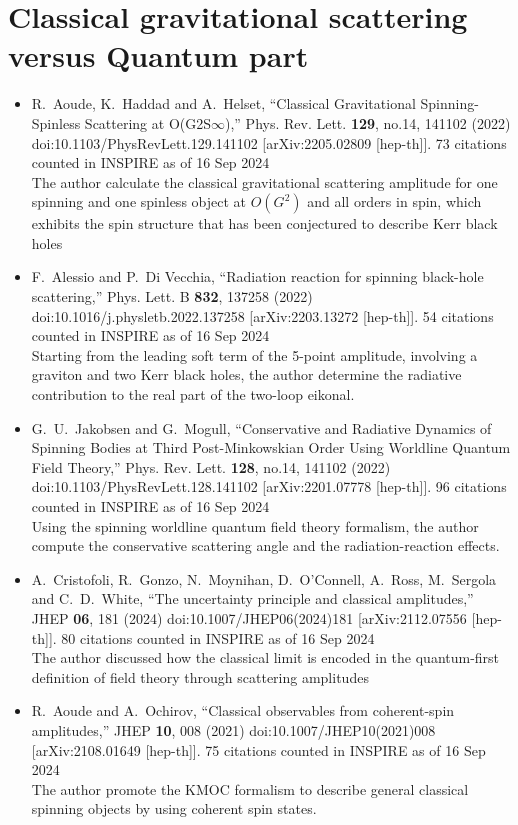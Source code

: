 \documentclass[a4paper,12pt]{article}
\begin{document}
\section*{Classical gravitational scattering versus Quantum part}
\begin{itemize}
    \item %
    R.~Aoude, K.~Haddad and A.~Helset,
    ``Classical Gravitational Spinning-Spinless Scattering at O(G2S\ensuremath{\infty}),''
    Phys. Rev. Lett. \textbf{129}, no.14, 141102 (2022)\\
    doi:10.1103/PhysRevLett.129.141102
    [arXiv:2205.02809 [hep-th]].
    73 citations counted in INSPIRE as of 16 Sep 2024\\
    The author calculate
    the classical gravitational scattering amplitude for one spinning and one spinless object at $O(G^2)$
    and all orders in spin, which exhibits the spin structure that has been
    conjectured to describe Kerr black holes
    \item %
    F.~Alessio and P.~Di Vecchia,
    ``Radiation reaction for spinning black-hole scattering,''
    Phys. Lett. B \textbf{832}, 137258 (2022)
    doi:10.1016/j.physletb.2022.137258
    [arXiv:2203.13272 [hep-th]].
    54 citations counted in INSPIRE as of 16 Sep 2024\\
    Starting from the leading soft term of the 5-point amplitude, involving a graviton and two Kerr black holes, the author determine the
    radiative contribution to the real part of the two-loop eikonal.
    \item %
    G.~U.~Jakobsen and G.~Mogull,
    ``Conservative and Radiative Dynamics of Spinning Bodies at Third Post-Minkowskian Order Using Worldline Quantum Field Theory,''
    Phys. Rev. Lett. \textbf{128}, no.14, 141102 (2022)
    doi:10.1103/PhysRevLett.128.141102
    [arXiv:2201.07778 [hep-th]].
    96 citations counted in INSPIRE as of 16 Sep 2024\\
    Using the spinning worldline quantum field theory formalism, the author compute the conservative scattering angle and the radiation-reaction effects.
    \item %
    A.~Cristofoli, R.~Gonzo, N.~Moynihan, D.~O'Connell, A.~Ross, M.~Sergola and C.~D.~White,
    ``The uncertainty principle and classical amplitudes,''
    JHEP \textbf{06}, 181 (2024)
    doi:10.1007/JHEP06(2024)181
    [arXiv:2112.07556 [hep-th]].
    80 citations counted in INSPIRE as of 16 Sep 2024\\
    The author discussed how the classical limit is encoded in the quantum-first definition of field theory through scattering amplitudes
    \item %
    R.~Aoude and A.~Ochirov,
    ``Classical observables from coherent-spin amplitudes,''
    JHEP \textbf{10}, 008 (2021)
    doi:10.1007/JHEP10(2021)008
    [arXiv:2108.01649 [hep-th]].
    75 citations counted in INSPIRE as of 16 Sep 2024\\
    The author promote the KMOC formalism  to describe general classical spinning objects by using coherent spin states. 
\end{itemize}
\end{document}
